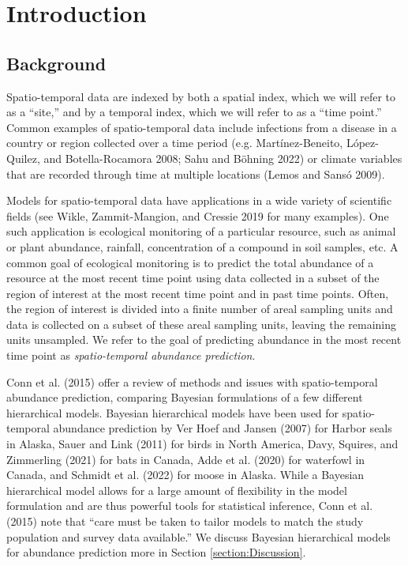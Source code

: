 \documentclass[smallextended]{svjour3}       %
\begin{document}
\hypertarget{intro}{%
\section{Introduction}\label{intro}}

\hypertarget{background}{%
\subsection{Background}\label{background}}

Spatio-temporal data are indexed by both a spatial index, which we will
refer to as a ``site,'' and by a temporal index, which we will refer to
as a ``time point.'' Common examples of spatio-temporal data include
infections from a disease in a country or region collected over a time
period (e.g. Martínez-Beneito, López-Quilez, and Botella-Rocamora 2008;
Sahu and Böhning 2022) or climate variables that are recorded through
time at multiple locations (Lemos and Sansó 2009).

Models for spatio-temporal data have applications in a wide variety of
scientific fields (see Wikle, Zammit-Mangion, and Cressie 2019 for many
examples). One such application is ecological monitoring of a particular
resource, such as animal or plant abundance, rainfall, concentration of
a compound in soil samples, etc. A common goal of ecological monitoring
is to predict the total abundance of a resource at the most recent time
point using data collected in a subset of the region of interest at the
most recent time point and in past time points. Often, the region of
interest is divided into a finite number of areal sampling units and
data is collected on a subset of these areal sampling units, leaving the
remaining units unsampled. We refer to the goal of predicting abundance
in the most recent time point as \emph{spatio-temporal abundance
prediction}.

Conn et al. (2015) offer a review of methods and issues with
spatio-temporal abundance prediction, comparing Bayesian formulations of
a few different hierarchical models. Bayesian hierarchical models have
been used for spatio-temporal abundance prediction by Ver Hoef and
Jansen (2007) for Harbor seals in Alaska, Sauer and Link (2011) for
birds in North America, Davy, Squires, and Zimmerling (2021) for bats in
Canada, Adde et al. (2020) for waterfowl in Canada, and Schmidt et al.
(2022) for moose in Alaska. While a Bayesian hierarchical model allows
for a large amount of flexibility in the model formulation and are thus
powerful tools for statistical inference, Conn et al. (2015) note that
``care must be taken to tailor models to match the study population and
survey data available.'' We discuss Bayesian hierarchical models for
abundance prediction more in Section \ref{section:Discussion}.
\end{document}
